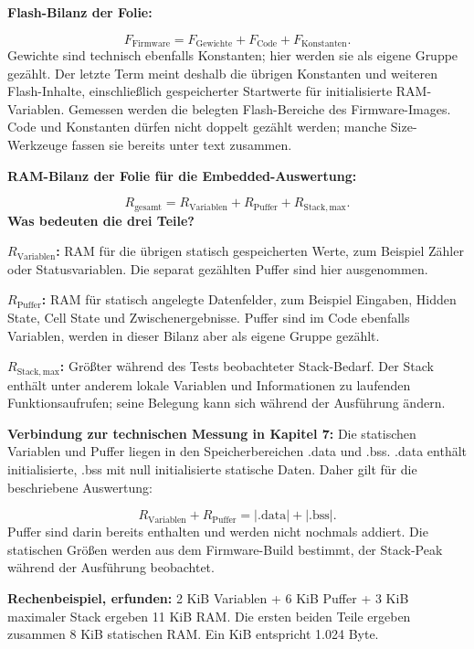 \documentclass[11pt,a4paper]{article}
\begin{document}
\textbf{Flash-Bilanz der Folie:}

\[ F_{\mathrm{Firmware}}=F_{\mathrm{Gewichte}}+F_{\mathrm{Code}}+F_{\mathrm{Konstanten}}. \]
Gewichte sind technisch ebenfalls Konstanten; hier werden sie als eigene Gruppe gezählt. Der letzte Term meint deshalb die übrigen Konstanten und weiteren Flash-Inhalte, einschließlich gespeicherter Startwerte für initialisierte RAM-Variablen. Gemessen werden die belegten Flash-Bereiche des Firmware-Images. Code und Konstanten dürfen nicht doppelt gezählt werden; manche Size-Werkzeuge fassen sie bereits unter text zusammen.

\textbf{RAM-Bilanz der Folie für die Embedded-Auswertung:}

\[ R_{\mathrm{gesamt}}=R_{\mathrm{Variablen}}+R_{\mathrm{Puffer}}+R_{\mathrm{Stack,max}}. \]
\textbf{Was bedeuten die drei Teile?}

\noindent\textbf{\(R_{\mathrm{Variablen}}\):} RAM für die übrigen statisch gespeicherten Werte, zum Beispiel Zähler oder Statusvariablen. Die separat gezählten Puffer sind hier ausgenommen.\par\smallskip
\noindent\textbf{\(R_{\mathrm{Puffer}}\):} RAM für statisch angelegte Datenfelder, zum Beispiel Eingaben, Hidden State, Cell State und Zwischenergebnisse. Puffer sind im Code ebenfalls Variablen, werden in dieser Bilanz aber als eigene Gruppe gezählt.\par\smallskip
\noindent\textbf{\(R_{\mathrm{Stack,max}}\):} Größter während des Tests beobachteter Stack-Bedarf. Der Stack enthält unter anderem lokale Variablen und Informationen zu laufenden Funktionsaufrufen; seine Belegung kann sich während der Ausführung ändern.\par\smallskip
\textbf{Verbindung zur technischen Messung in Kapitel 7:} Die statischen Variablen und Puffer liegen in den Speicherbereichen .data und .bss. .data enthält initialisierte, .bss mit null initialisierte statische Daten. Daher gilt für die beschriebene Auswertung:

\[ R_{\mathrm{Variablen}}+R_{\mathrm{Puffer}}=|\mathrm{.data}|+|\mathrm{.bss}|. \]
Puffer sind darin bereits enthalten und werden nicht nochmals addiert. Die statischen Größen werden aus dem Firmware-Build bestimmt, der Stack-Peak während der Ausführung beobachtet.

\textbf{Rechenbeispiel, erfunden:} 2 KiB Variablen + 6 KiB Puffer + 3 KiB maximaler Stack ergeben 11 KiB RAM. Die ersten beiden Teile ergeben zusammen 8 KiB statischen RAM. Ein KiB entspricht 1.024 Byte.
\end{document}
